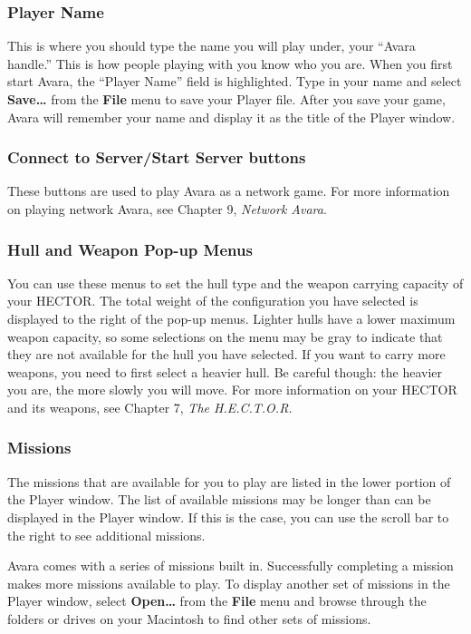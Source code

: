 \documentclass{article}
\begin{document}
\subsubsection{Player Name}
This is where you should type the name you will play under, your ``Avara handle.'' This is how people playing with you know who you are. When you first start Avara, the ``Player Name'' field is highlighted. Type in your name and select \textbf{Save\dots} from the \textbf{File} menu to save your Player file. After you save your game, Avara will remember your name and display it as the title of the Player window.

\subsubsection{Connect to Server/Start Server buttons}
These buttons are used to play Avara as a network game. For more information on playing network Avara, see Chapter 9, \textit{Network Avara}.

\subsubsection{Hull and Weapon Pop-up Menus}
You can use these menus to set the hull type and the weapon carrying capacity of your HECTOR. The total weight of the configuration you have selected is displayed to the right of the pop-up menus. Lighter hulls have a lower maximum weapon capacity, so some selections on the menu may be gray to indicate that they are not available for the hull you have selected. If you want to carry more weapons, you need to first select a heavier hull. Be careful though: the heavier you are, the more slowly you will move. For more information on your HECTOR and its weapons, see Chapter 7, \textit{The H.E.C.T.O.R.}

\subsubsection{Missions}
The missions that are available for you to play are listed in the lower portion of the Player window. The list of available missions may be longer than can be displayed in the Player window. If this is the case, you can use the scroll bar to the right to see additional missions.

Avara comes with a series of missions built in. Successfully completing a mission makes more missions available to play. To display another set of missions in the Player window, select \textbf{Open\dots} from the \textbf{File} menu and browse through the folders or drives on your Macintosh to find other sets of missions.
\end{document}
